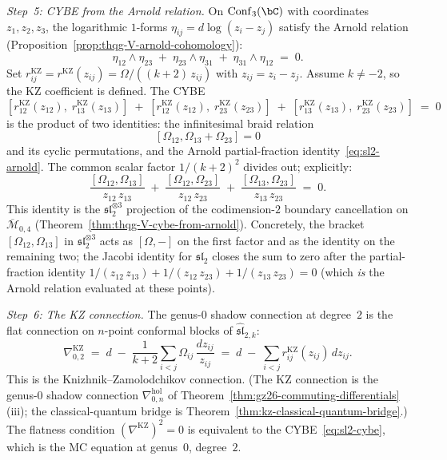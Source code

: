 \begin{computation}
\emph{Step~5: CYBE from the Arnold relation.}
On $\operatorname{Conf}_3(\bC)$ with coordinates $z_1, z_2, z_3$,
the logarithmic $1$-forms $\eta_{ij} = d\log(z_i - z_j)$ satisfy
the Arnold relation
(Proposition~\ref{prop:thqg-V-arnold-cohomology}):
\begin{equation}\label{eq:sl2-arnold}
\eta_{12} \wedge \eta_{23}
\;+\;
\eta_{23} \wedge \eta_{31}
\;+\;
\eta_{31} \wedge \eta_{12}
\;=\; 0.
\end{equation}
Set $r^{\mathrm{KZ}}_{ij} = r^{\mathrm{KZ}}(z_{ij})
= \Omega/((k+2)\,z_{ij})$ with
$z_{ij} = z_i - z_j$.
Assume $k\neq -2$, so the KZ coefficient is defined.
The CYBE
\begin{equation}\label{eq:sl2-cybe}
[r^{\mathrm{KZ}}_{12}(z_{12}),\; r^{\mathrm{KZ}}_{13}(z_{13})]
\;+\;
[r^{\mathrm{KZ}}_{12}(z_{12}),\; r^{\mathrm{KZ}}_{23}(z_{23})]
\;+\;
[r^{\mathrm{KZ}}_{13}(z_{13}),\; r^{\mathrm{KZ}}_{23}(z_{23})]
\;=\; 0
\end{equation}
is the product of two identities: the infinitesimal braid relation
\[
[\Omega_{12},\Omega_{13}+\Omega_{23}]=0
\]
and its cyclic permutations, and the Arnold partial-fraction
identity~\eqref{eq:sl2-arnold}. The common scalar factor
$1/(k+2)^2$ divides out; explicitly:
\[
\frac{[\Omega_{12}, \Omega_{13}]}{z_{12}\,z_{13}}
\;+\;
\frac{[\Omega_{12}, \Omega_{23}]}{z_{12}\,z_{23}}
\;+\;
\frac{[\Omega_{13}, \Omega_{23}]}{z_{13}\,z_{23}}
\;=\; 0.
\]
This identity is the $\mathfrak{sl}_2^{\otimes 3}$ projection of
the codimension-$2$ boundary cancellation on
$\overline{\mathcal{M}}_{0,4}$
(Theorem~\ref{thm:thqg-V-cybe-from-arnold}).
Concretely, the bracket
$[\Omega_{12}, \Omega_{13}]$ in $\mathfrak{sl}_2^{\otimes 3}$
acts as $[\Omega, -]$ on the first factor and as the identity on the
remaining two; the Jacobi identity for $\mathfrak{sl}_2$ closes the
sum to zero after the partial-fraction identity
$1/(z_{12}\,z_{13}) + 1/(z_{12}\,z_{23}) + 1/(z_{13}\,z_{23}) = 0$
(which \emph{is} the Arnold relation evaluated at these points).

\emph{Step~6: The KZ connection.}
The genus-$0$ shadow connection at degree~$2$
is the flat connection on $n$-point conformal blocks
of $\widehat{\mathfrak{sl}}_{2,k}$:
\begin{equation}\label{eq:sl2-kz-connection}
\nabla^{\mathrm{KZ}}_{0,2}
\;=\;
d \;-\;
\frac{1}{k + 2}
\sum_{i < j}
\Omega_{ij}\,\frac{dz_{ij}}{z_{ij}}
\;=\;
d \;-\;
\sum_{i < j}
r^{\mathrm{KZ}}_{ij}(z_{ij})\, dz_{ij}.
\end{equation}
This is the Knizhnik--Zamolodchikov connection.
(The KZ connection is the genus-$0$ shadow connection $\nabla^{\mathrm{hol}}_{0,n}$ of Theorem~\ref{thm:gz26-commuting-differentials}(iii); the classical-quantum bridge is Theorem~\ref{thm:kz-classical-quantum-bridge}.)
The flatness condition
$(\nabla^{\mathrm{KZ}})^2 = 0$ is equivalent to the CYBE~\eqref{eq:sl2-cybe}, which is the MC equation at genus~$0$,
degree~$2$.


\end{computation}
